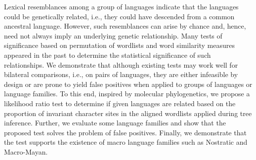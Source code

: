 Lexical resemblances among a group of languages indicate that the languages could be genetically related, i.e., they could have descended from a common ancestral language.  However, such resemblances can arise by chance and, hence, need not always imply an underlying genetic relationship. Many tests of significance based on permutation of wordlists and word similarity measures appeared in the past to determine the statistical significance of such relationships. We demonstrate that although existing tests may work well for bilateral comparisons, i.e., on pairs of languages, they are either infeasible by design or are prone to yield false positives when applied to groups of languages or language families. To this end, inspired by molecular phylogenetics, we propose a likelihood ratio test to determine if given languages are related based on the proportion of invariant character sites in the aligned wordlists applied during tree inference. Further, we evaluate some language families and show that the proposed test solves the problem of false positives. Finally, we demonstrate that the test supports the existence of macro language families such as Nostratic and Macro-Mayan.